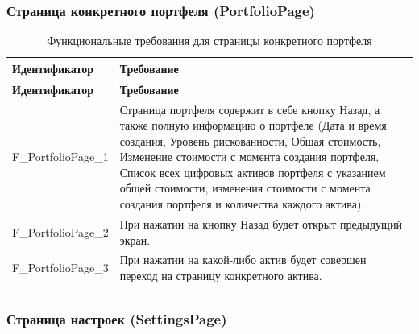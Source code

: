 \documentclass[a4paper, 14pt]{article}
\begin{document}
\subsubsection{Страница конкретного портфеля (PortfolioPage)}

\begin{longtable}{| p{} | p{} |}
    \hline
    \textbf{Идентификатор}          & \textbf{Требование}                                                                                                                                                                \\
    \hline
    \endfirsthead
    \hline
    \textbf{Идентификатор}          & \textbf{Требование}                                                                                                                                                                \\
    \hline
    \endhead

    F\_PortfolioPage\_1       & Страница портфеля содержит в себе кнопку Назад, а также полную информацию о портфеле (Дата и время создания, Уровень рискованности, Общая стоимость, Изменение стоимости с момента создания портфеля, Список всех цифровых активов портфеля с указанием общей стоимости, изменения стоимости с момента создания портфеля и количества каждого актива).      \\ \hline
    F\_PortfolioPage\_2       & При нажатии на кнопку Назад будет открыт предыдущий экран.                                                                                                                         \\ \hline
    F\_PortfolioPage\_3       & При нажатии на какой-либо актив будет совершен переход на страницу конкретного актива.                                                                                             \\ \hline

    \caption{Функциональные требования для страницы конкретного портфеля}
\end{longtable}

\subsubsection{Страница настроек (SettingsPage)}
\end{document}
